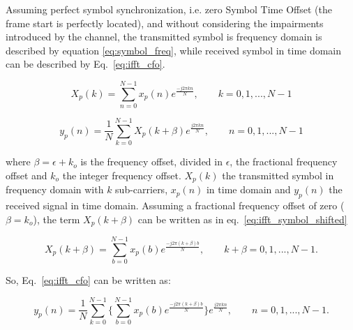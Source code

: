 Assuming perfect symbol synchronization, i.e. zero Symbol Time Offset (the frame start is perfectly located), and without considering the impairments introduced by the channel, the transmitted symbol is frequency domain is described by equation \ref{eq:symbol_freq}, while received symbol in time domain can be described by Eq.~\ref{eq:ifft_cfo}. 

\begin{equation} 
     X_{p}(k) = \sum\limits_{n=0}^{N-1} x_{p}(n)e^{\frac{-j2{\pi}kn}{N}}, \qquad k = 0,1,...,N-1
    \label{eq:symbol_freq}
\end{equation}



\begin{equation} 
     y_{p}(n) = \frac{1}{N}\sum\limits_{k=0}^{N-1} X_{p}(k+\beta)e^{\frac{j2{\pi}kn}{N}}, \qquad n = 0,1,...,N-1
    \label{eq:ifft_cfo}
\end{equation}


\noindent where $\beta = \epsilon + k_{o}$ is the frequency offset, divided in $\epsilon$, the fractional frequency offset and $k_{o}$ the integer frequency offset. $X_p(k)$ the transmitted symbol in frequency domain with $k$ sub-carriers, $x_p(n)$ in time domain and $y_p(n)$ the received signal in time domain. Assuming a fractional frequency offset of zero ($\beta = k_{o}$), the term $X_{p}(k+\beta)$ can be written as in eq.~\ref{eq:ifft_symbol_shifted}

\begin{equation} 
X_{p}(k+\beta) = \sum\limits_{b=0}^{N-1} x_{p}(b)e^{\frac{-j2{\pi}(k+\beta)b}{N}}, \qquad k+\beta = 0,1,...,N-1 .
    \label{eq:ifft_symbol_shifted}
\end{equation}

So, Eq.~\ref{eq:ifft_cfo} can be written as: %

\begin{equation} 
     y_{p}(n) = \frac{1}{N}\sum\limits_{k=0}^{N-1} \Big\{ \sum\limits_{b=0}^{N-1} x_{p}(b)e^{\frac{-j2{\pi}(k+\beta)b}{N}} \Big\} e^{\frac{j2{\pi}kn}{N}}, \qquad n = 0,1,...,N-1.
    \label{eq:ifft_cfo_symbol_shifted}
\end{equation}

